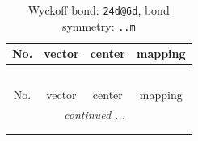 \documentclass[fleqn,8pt]{jsarticle}
\begin{document}
\renewcommand{\arraystretch}{1.2}
\begin{longtable}{cccc}
\caption{Wyckoff bond: {\tt 24d@6d}, bond symmetry: {\tt ..m}}
 \\
 \hline \hline
No. & vector & center & mapping \\ \hline \endfirsthead

\multicolumn{3}{l}{\tablename\ \thetable{}} \\
 \hline \hline
No. & vector & center & mapping \\ \hline \endhead

 \hline \hline
\multicolumn{3}{r}{\footnotesize\it continued ...} \\ \endfoot

 \hline \hline
\multicolumn{3}{r}{} \\ \endlastfoot


\end{longtable}
\end{document}
